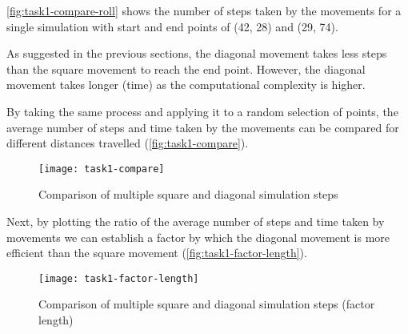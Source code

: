 \autoref{fig:task1-compare-roll} shows the number of steps taken by the movements for a single simulation with start and end points of (42, 28) and (29, 74).


As suggested in the previous sections, the diagonal movement takes less steps than the square movement to reach the end point.
However, the diagonal movement takes longer (time) as the computational complexity is higher.



\clearpage

By taking the same process and applying it to a random selection of points, 
the average number of steps and time taken by the movements can be compared for different distances travelled (\autoref{fig:task1-compare}).



\begin{figure}[ht]
    \centering
    \texttt{[image: task1-compare]}
    \caption[Comparison of multiple square and diagonal simulation steps]{Comparison of multiple square and diagonal simulation steps}
    \label{fig:task1-compare}
\end{figure}

Next, by plotting the ratio of the average number of steps and time taken by movements
we can establish a factor by which the diagonal movement is more efficient than the square movement (\autoref{fig:task1-factor-length}).

\begin{figure}[ht]
    \centering
    \texttt{[image: task1-factor-length]}
    \caption[Comparison of multiple square and diagonal simulation steps (factor length)]{Comparison of multiple square and diagonal simulation steps (factor length)}
    \label{fig:task1-factor-length}
\end{figure}

